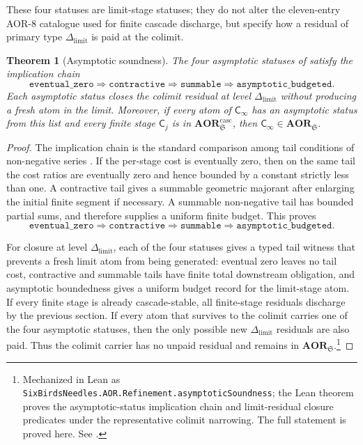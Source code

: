 \documentclass[11pt]{article}
\newcommand{\AOR}{\mathbf{AOR}}
\newcommand{\CascadeStableAOR}{\mathbf{AOR}^{\mathrm{casc}}}
\newcommand{\Dlimit}{\Delta_{\mathrm{limit}}}
\newtheorem{theorem}{Theorem}[section]
\theoremstyle{definition}
\begin{document}
These four statuses are limit-stage statuses; they do not alter the
eleven-entry AOR-8 catalogue used for finite cascade discharge, but
specify how a residual of primary type \(\Dlimit\) is paid at the
colimit.

\begin{theorem}[Asymptotic soundness]\label{thm:aor:asymptotic-soundness}
The four asymptotic statuses of
 satisfy the implication chain
\[
  \texttt{eventual\_zero} \Rightarrow \texttt{contractive}
  \Rightarrow \texttt{summable} \Rightarrow \texttt{asymptotic\_budgeted}.
\]
Each asymptotic status closes the colimit residual at level $\Dlimit$
without producing a fresh atom in the limit.  Moreover, if every atom
of $\mathsf C_\infty$ has an asymptotic status from this list and every
finite stage $\mathsf C_j$ is in $\CascadeStableAOR_{\mathfrak S}$,
then $\mathsf C_\infty\in\AOR_{\mathfrak S}$.
\end{theorem}

\begin{proof}
The implication chain is the standard comparison among tail conditions
of non-negative series \citep{Rudin1976Principles}.  If the per-stage
cost is eventually zero, then on the same tail the cost ratios are
eventually zero and hence bounded by a constant strictly less than
one.  A contractive tail gives a summable geometric majorant after
enlarging the initial finite segment if necessary.  A summable
non-negative tail has bounded partial sums, and therefore supplies a
uniform finite budget.  This proves
\[
  \texttt{eventual\_zero} \Rightarrow \texttt{contractive}
  \Rightarrow \texttt{summable} \Rightarrow \texttt{asymptotic\_budgeted}.
\]

For closure at level \(\Dlimit\), each of the four statuses gives a typed
tail witness that prevents a fresh limit atom from being generated: eventual
zero leaves no tail cost, contractive and summable tails have finite total
downstream obligation, and asymptotic boundedness gives a uniform budget
record for the limit-stage atom.  If every finite stage is already
cascade-stable, all finite-stage residuals discharge by the previous section.
If every atom that survives to the colimit carries one of the four
asymptotic statuses, then the only possible new \(\Dlimit\) residuals are
also paid.  Thus the colimit carrier has no unpaid residual and remains in
\(\AOR_{\mathfrak S}\).\footnote{Mechanized in Lean as \texttt{SixBirdsNeedles.AOR.Refinement.asymptoticSoundness}; the Lean theorem proves the asymptotic-status implication chain and limit-residual closure predicates under the representative colimit narrowing. The full statement is proved here. See .}
\end{proof}
\end{document}
